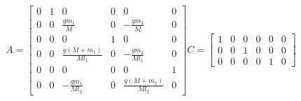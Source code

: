 \documentclass[preview]{standalone}
\begin{document}
\begin{align*}
A = \left[\begin{matrix}0 & 1 & 0 & 0 & 0 & 0\\0 & 0 & \frac{g m_{1}}{M} & 0 & - \frac{g m_{2}}{M} & 0\\0 & 0 & 0 & 1 & 0 & 0\\0 & 0 & \frac{g \left(M + m_{1}\right)}{M l_{1}} & 0 & - \frac{g m_{2}}{M l_{1}} & 0\\0 & 0 & 0 & 0 & 0 & 1\\0 & 0 & - \frac{g m_{1}}{M l_{2}} & 0 & \frac{g \left(M + m_{2}\right)}{M l_{2}} & 0\end{matrix}\right] C = \left[\begin{matrix}1 & 0 & 0 & 0 & 0 & 0\\0 & 0 & 1 & 0 & 0 & 0\\0 & 0 & 0 & 0 & 1 & 0\end{matrix}\right]
\end{align*}
\end{document}

